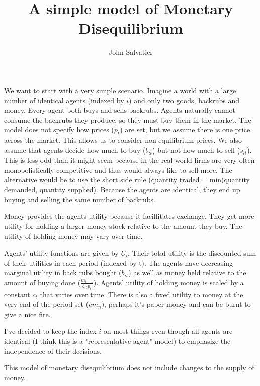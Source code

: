 \documentclass[14pt]{article} \usepackage{amsmath}
\title{A simple model of Monetary Disequilibrium}
\author{John Salvatier}
\begin{document}
\maketitle

We want to start with a very simple scenario. Imagine a world with a large number of identical agents (indexed by $i$) and only two goods, backrubs and money. Every agent both buys and sells backrubs. Agents naturally cannot consume the backrubs they produce, so they must buy them in the market. The model does not specify how prices ($p_t$) are set, but we assume there is one price across the market. This allows us to consider non-equilibrium prices. We also assume that agents decide how much to buy ($b_{it}$) but not how much to sell ($s_{it}$). This is less odd than it might seem because in the real world firms are very often monopolistically competitive and thus would always like to sell more. The alternative would be to use the short side rule (quantity traded = min(quantity demanded, quantity supplied). Because the agents are identical, they end up buying and selling the same number of backrubs.

Money provides the agents utility because it facillitates exchange. They get more utility for holding a larger money stock relative to the amount they buy. The utility of holding money may vary over time.

Agents' utility functions are given by $U_i$. Their total utility is the discounted sum of their utilities in each period (indexed by t). The agents have decreasing marginal utility in back rubs bought ($b_{it}$) as well as money held relative to the amount of buying done ($\frac{m_{t-1}}{b_{it} p_t}$). Agents' utility of holding money is scaled by a constant $c_t$ that varies over time.  There is also a fixed utility to money at the very end of the period set ($e m_n$), perhaps it's paper money and can be burnt to give a nice fire.

I've decided to keep the index $i$ on most things even though all agents are identical (I think this is a "representative agent" model) to emphasize the independence of their decisions. 

This model of monetary disequilibrium does not include changes to the supply of money.
\end{document}
